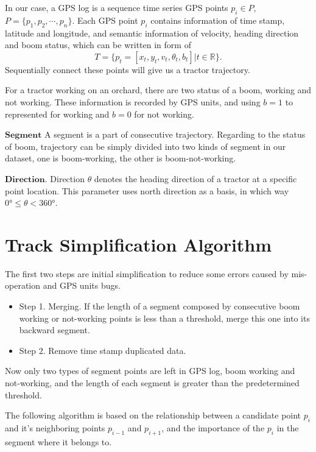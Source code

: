 In our case, a GPS log is a sequence time series GPS points $p_i \in P$, $P=\{ p_1,p_2, \cdots, p_n \}$. Each GPS point $p_i$ contains information of time stamp, latitude and longitude, and semantic information of velocity, heading direction and boom status, which can be written in form of
\begin{equation}
T=\{p_t=[x_t,y_t,v_t,\theta_t,b_t] | t \in \mathbb{R} \}.
\end{equation}
Sequentially connect these points will give us a tractor trajectory.

For a  tractor working on an orchard, there are two status of a boom, working and not working. These information is recorded by GPS units, and using $b=1$ to represented for working and $b=0$ for not working.

$\mathbf{Segment}$ A segment is a part of consecutive trajectory. Regarding to the status of boom, trajectory can be simply divided into two kinds of segment in our dataset, one is boom-working, the other is boom-not-working. 

$\mathbf{Direction}$. Direction $\theta$ denotes the heading direction of a tractor at a specific point location. This parameter uses north direction as a basis, in which way $\ang{0} \leq \theta < \ang{360}$.

\section{Track Simplification Algorithm}

The first two steps are initial simplification to reduce some errors caused by mis-operation and GPS units bugs.
\begin{itemize}
\item Step 1. Merging. If the length of a segment composed by consecutive boom working or not-working points is less than a threshold, merge this one into its backward segment. 
\item Step 2. Remove time stamp duplicated data.
\end{itemize}
Now only two types of segment points are left in GPS log, boom working and not-working, and the length of each segment is greater than the predetermined threshold.

The following algorithm is based on the relationship between a candidate point $p_i$ and it's neighboring points $p_{i-1}$ and $p_{i+1}$, and the importance of the $p_i$ in the segment where it belongs to. 

